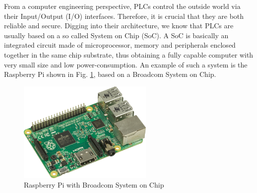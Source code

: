 From a computer engineering perspective, PLCs control the outside world via their Input/Output (I/O) interfaces. Therefore, it is crucial that they are both reliable and secure.
Digging into their architecture, we know that PLCs are usually based on a so called System on Chip (SoC).
A SoC is basically an integrated circuit made of microprocessor, memory and peripherals enclosed together in the same chip substrate,
thus obtaining a fully capable computer with very small size and low power-consumption.
An example of such a system is the Raspberry Pi shown in Fig. \ref{fig:raspberry}, based on a Broadcom System on Chip.
\begin{figure}[h]
\centerline{\includegraphics[width=0.58\textwidth]{res/raspberry}}
\caption{Raspberry Pi with Broadcom System on Chip \cite{raspberry} \label{fig:raspberry}}
\end{figure}

